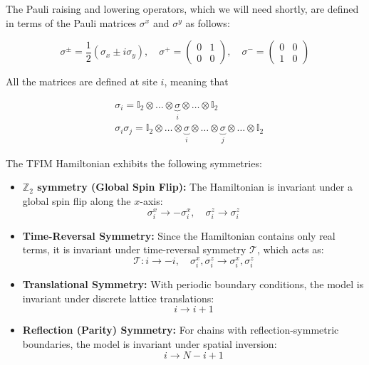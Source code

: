 \documentclass{article}
\begin{document}
The Pauli raising and lowering operators, which we will need shortly, are defined in terms of the Pauli matrices $\sigma^x$ and $\sigma^y$ as follows:

\begin{equation}
\sigma^{\pm} = \frac{1}{2} (\sigma_x \pm i\sigma_y), \quad
\sigma^+ = \begin{pmatrix} 0 & 1 \\ 0 & 0 \end{pmatrix}, \quad
\sigma^- = \begin{pmatrix} 0 & 0 \\ 1 & 0 \end{pmatrix}
\end{equation}

All the matrices are defined at site $i$, meaning that

\begin{align}
&\sigma_i = \mathbb{I}_2\otimes\hdots\otimes\underbrace{\sigma}_{i}\otimes\hdots\otimes\mathbb{I}_2\\
&\sigma_i\sigma_j = \mathbb{I}_2\otimes\hdots\otimes\underbrace{\sigma}_{i}\otimes\hdots\otimes\underbrace{\sigma}_{j}\otimes\hdots\otimes\mathbb{I}_2
\end{align}


The TFIM Hamiltonian exhibits the following symmetries:

\begin{itemize}
    \item \textbf{$\mathbb{Z}_2$ symmetry (Global Spin Flip):} The Hamiltonian is invariant under a global spin flip along the $x$-axis:
    \[
    \sigma_i^x \to -\sigma_i^x, \quad \sigma_i^z \to \sigma_i^z
    \]

    \item \textbf{Time-Reversal Symmetry:} Since the Hamiltonian contains only real terms, it is invariant under time-reversal symmetry $\mathcal{T}$, which acts as:
    \[
    \mathcal{T}: i \to -i, \quad \sigma_i^x, \sigma_i^z \to \sigma_i^x, \sigma_i^z
    \]

    \item \textbf{Translational Symmetry:} With periodic boundary conditions, the model is invariant under discrete lattice translations:
    \[
    i \to i+1
    \]

    \item \textbf{Reflection (Parity) Symmetry:} For chains with reflection-symmetric boundaries, the model is invariant under spatial inversion:
    \[
    i \to N - i + 1
    \]
\end{itemize}
\end{document}
